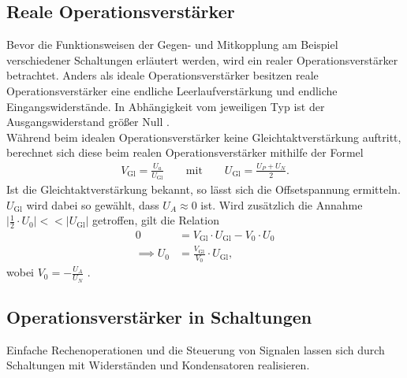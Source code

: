 \subsection{Reale Operationsverstärker}
\noindent Bevor die Funktionsweisen der Gegen- und Mitkopplung am Beispiel
verschiedener Schaltungen erläutert werden, wird ein realer Operationsverstärker
betrachtet. Anders als ideale Operationsverstärker besitzen reale
Operationsverstärker eine endliche Leerlaufverstärkung und endliche
Eingangswiderstände. In Abhängigkeit vom jeweiligen Typ ist der Ausgangswiderstand
größer Null \cite{federau}.\\
\noindent Während beim idealen Operationsverstärker keine Gleichtaktverstärkung
auftritt, berechnet sich diese beim realen Operationsverstärker mithilfe der
Formel
\begin{align}
  V_\text{Gl} = \frac{U_a}{U_\text{Gl}} \qquad \text{mit} \qquad U_\text{Gl} = \frac{U_P + U_N}{2}.
  \label{eqn:03}
\end{align}
\noindent Ist die Gleichtaktverstärkung bekannt, so lässt sich die Offsetspannung
ermitteln. $U_\text{Gl}$ wird dabei so gewählt, dass $U_A \approx 0$ ist. Wird
zusätzlich die Annahme $\bigr| \frac{1}{2} \cdot U_0 \bigr| << \bigr| U_\text{Gl} \bigr|$
getroffen, gilt die Relation
\begin{align}
  0 &= V_\text{Gl} \cdot U_\text{Gl} - V_0 \cdot U_0 \\
  \implies U_0 &= \frac{V_\text{Gl}}{V_0} \cdot U_\text{Gl},
  \label{eqn:04}
\end{align}
\noindent wobei $V_0 = - \frac{U_A}{U_N}$ \cite{muenster}.
\subsection{Operationsverstärker in Schaltungen}
Einfache Rechenoperationen und die Steuerung von Signalen lassen sich durch
Schaltungen mit Widerständen und Kondensatoren realisieren.
